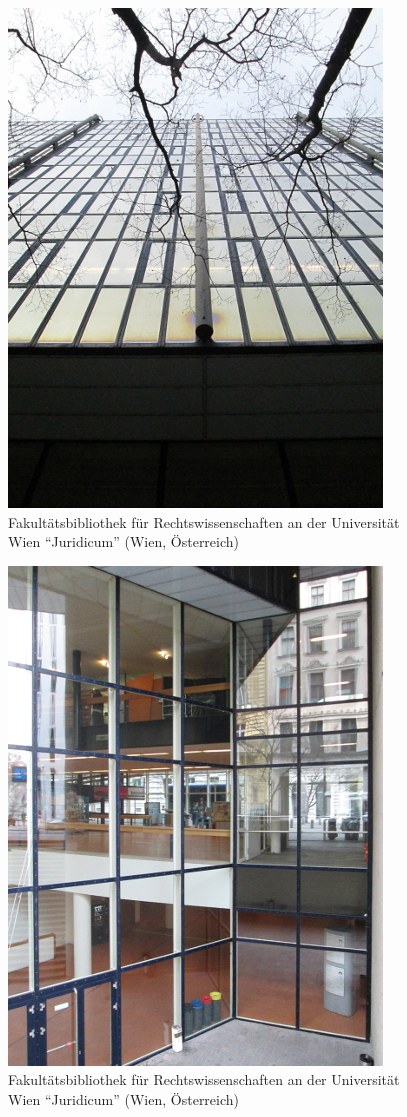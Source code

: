 \documentclass[a4paper,
fontsize=11pt,
oneside,
numbers=noperiodatend,
parskip=half-,
bibliography=totoc,
final
]{scrartcl}
\begin{document}
\begin{figure}[htbp]
\centering
\includegraphics{./img/049.jpg}
\caption{Fakultätsbibliothek für Rechtswissenschaften an der
Universität Wien \enquote{Juridicum} (Wien,
Österreich)}
\end{figure}

\begin{figure}[htbp]
\centering
\includegraphics{./img/050.jpg}
\caption{Fakultätsbibliothek für Rechtswissenschaften an der
Universität Wien \enquote{Juridicum} (Wien,
Österreich)}
\end{figure}
\end{document}
